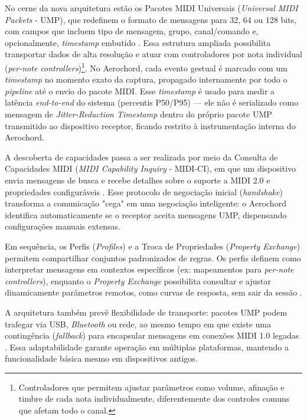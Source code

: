No cerne da nova arquitetura estão os Pacotes MIDI Universais (\textit{Universal MIDI Packets} - UMP), que redefinem o formato de mensagens para 32, 64 ou 128 bits, com campos que incluem tipo de mensagem, grupo, canal/comando e, opcionalmente, \textit{timestamp} embutido \cite{UMPProtocol2023}. Essa estrutura ampliada possibilita transportar dados de alta resolução e atuar com controladores por nota individual (\textit{per-note controllers})\footnote{Controladores que permitem ajustar parâmetros como volume, afinação e timbre de cada nota individualmente, diferentemente dos controles comuns que afetam todo o canal.}. No Aerochord, cada evento gestual é marcado com um \textit{timestamp} no momento exato da captura, propagado internamente por todo o \textit{pipeline} até o envio do pacote MIDI. Esse \textit{timestamp} é usado para medir a latência \textit{end-to-end} do sistema (percentis P50/P95) — ele não é serializado como mensagem de \textit{Jitter-Reduction Timestamp} dentro do próprio pacote UMP transmitido ao dispositivo receptor, ficando restrito à instrumentação interna do Aerochord.

A descoberta de capacidades passa a ser realizada por meio da Consulta de Capacidades MIDI (\textit{MIDI Capability Inquiry} - MIDI-CI), em que um dispositivo envia mensagens de busca e recebe detalhes sobre o suporte a MIDI 2.0 e propriedades configuráveis \cite{MIDICI2023}. Esse protocolo de negociação inicial (\textit{handshake}) transforma a comunicação "cega" em uma negociação inteligente: o Aerochord identifica automaticamente se o receptor aceita mensagens UMP, dispensando configurações manuais extensas.

Em sequência, os Perfis (\textit{Profiles}) e a Troca de Propriedades (\textit{Property Exchange}) permitem compartilhar conjuntos padronizados de regras. Os perfis definem como interpretar mensagens em contextos específicos (ex: mapeamentos para \textit{per-note controllers}), enquanto o \textit{Property Exchange} possibilita consultar e ajustar dinamicamente parâmetros remotos, como curvas de resposta, sem sair da sessão \cite{MIDICIProfiles2023,MIDIPropertyExchange2023}. 

A arquitetura também prevê flexibilidade de transporte: pacotes UMP podem trafegar via USB, \textit{Bluetooth} ou rede, ao mesmo tempo em que existe uma contingência (\textit{fallback}) para encapsular mensagens em conexões MIDI 1.0 legadas \cite{UMPProtocol2023}. Essa adaptabilidade garante operação em múltiplas plataformas, mantendo a funcionalidade básica mesmo em dispositivos antigos.

